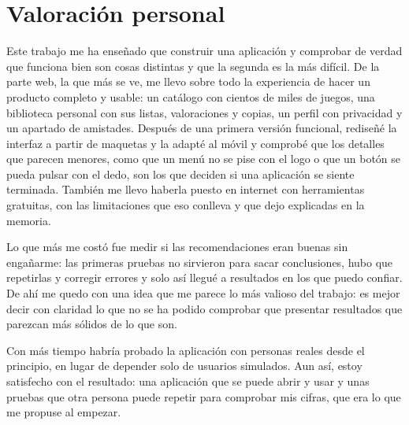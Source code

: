 \section{Valoración personal}\label{sec:conc-valoracion-personal}

Este trabajo me ha enseñado que construir una aplicación y comprobar de verdad que funciona bien son cosas distintas y
que la segunda es la más difícil. De la parte web, la que más se ve, me llevo sobre todo la experiencia de hacer un
producto completo y usable: un catálogo con cientos de miles de juegos, una biblioteca personal con sus listas,
valoraciones y copias, un perfil con privacidad y un apartado de amistades. Después de una primera versión funcional,
rediseñé la interfaz a partir de maquetas y la adapté al móvil y comprobé que los detalles que parecen menores, como
que un menú no se pise con el logo o que un botón se pueda pulsar con el dedo, son los que deciden si una aplicación se
siente terminada. También me llevo haberla puesto en internet con herramientas gratuitas, con las limitaciones que eso
conlleva y que dejo explicadas en la memoria.

Lo que más me costó fue medir si las recomendaciones eran buenas sin engañarme: las primeras pruebas no sirvieron para
sacar conclusiones, hubo que repetirlas y corregir errores y solo así llegué a resultados en los que puedo confiar. De
ahí me quedo con una idea que me parece lo más valioso del trabajo: es mejor decir con claridad lo que no se ha podido
comprobar que presentar resultados que parezcan más sólidos de lo que son.

Con más tiempo habría probado la aplicación con personas reales desde el principio, en lugar de depender solo de usuarios
simulados. Aun así, estoy satisfecho con el resultado: una aplicación que se puede abrir y usar y unas pruebas que otra
persona puede repetir para comprobar mis cifras, que era lo que me propuse al empezar.

